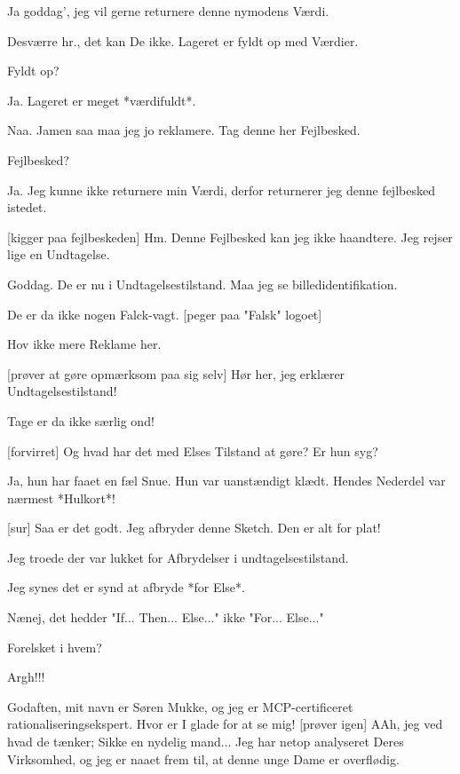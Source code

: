 \documentclass[a4paper,12pt]{article}
\begin{document}
\begin{sketch}
 Ja goddag', jeg vil gerne returnere denne nymodens Værdi.

 Desværre hr., det kan De ikke. Lageret er fyldt op med
Værdier.

 Fyldt op?

 Ja. Lageret er meget *værdifuldt*.

 Naa. Jamen saa maa jeg jo reklamere. Tag denne her
Fejlbesked.

 Fejlbesked?

 Ja. Jeg kunne ikke returnere min Værdi, derfor returnerer jeg
denne fejlbesked istedet. 

[kigger paa fejlbeskeden] Hm. Denne Fejlbesked kan jeg ikke
haandtere. Jeg rejser lige en Undtagelse.


 Goddag. De er nu i Undtagelsestilstand. Maa jeg se
billedidentifikation.

 De er da ikke nogen Falck-vagt. [peger paa "Falsk" logoet]

 Hov ikke mere Reklame her.

[prøver at gøre opmærksom paa sig selv] Hør her, jeg erklærer
Undtagelsestilstand!

 Tage er da ikke særlig ond!

[forvirret] Og hvad har det med Elses Tilstand at gøre? Er hun
syg?

 Ja, hun har faaet en fæl Snue. Hun var uanstændigt klædt.
Hendes Nederdel var nærmest *Hulkort*!


[sur] Saa er det godt. Jeg afbryder denne Sketch. Den er alt
for plat!

Jeg troede der var lukket for Afbrydelser i
undtagelsestilstand.

Jeg synes det er synd at afbryde *for Else*.

Nænej, det hedder "If... Then... Else..." ikke "For...
Else..."

 Forelsket i hvem?

 Argh!!!


 Godaften, mit navn er Søren Mukke, og jeg er MCP-certificeret
rationaliseringsekspert. Hvor er I glade for at se mig! 
[prøver igen] AAh, jeg ved hvad de tænker; Sikke en nydelig mand... Jeg
har netop analyseret Deres Virksomhed, og jeg er naaet frem til, at
denne unge Dame er overflødig.


\end{sketch}
\end{document}
